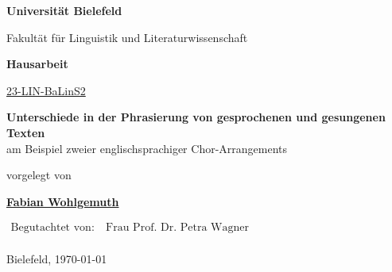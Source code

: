 \begin{center}

\Huge{\textbf{Universität Bielefeld}}

\LARGE{Fakultät für Linguistik und Literaturwissenschaft}

\vfill

\LARGE{\textbf{Hausarbeit}}

\Large

\href{https://ekvv.uni-bielefeld.de/sinfo/publ/modul/26797308}{23-LIN-BaLinS2}

\vfill


\vspace*{1cm}

\LARGE{\textbf{Unterschiede in der Phrasierung von gesprochenen und gesungenen Texten}\\\Large{am Beispiel zweier englischsprachiger Chor-Arrangements}}

\Large

\vfill

vorgelegt von

\vspace*{1cm}

\textbf{\href{https://fabianwohlgemuth.de}{Fabian Wohlgemuth}}

\vfill

$\begin{aligned}
\text{Begutachtet von:}&\ \text{Frau Prof. Dr. Petra Wagner}\\
\end{aligned}$

\vfill

Bielefeld, \today
{}

\end{center}
\restoregeometry